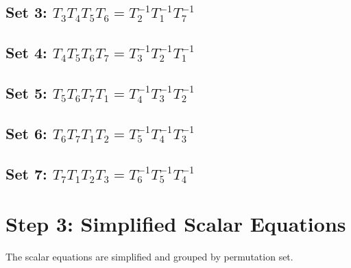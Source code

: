 \documentclass[12pt, a4paper]{article}
\begin{document}
\subsection*{Set 3: $T_{3}T_{4}T_{5}T_{6} = T_{2}^{-1}T_{1}^{-1}T_{7}^{-1}$}
\subsection*{Set 4: $T_{4}T_{5}T_{6}T_{7} = T_{3}^{-1}T_{2}^{-1}T_{1}^{-1}$}
\subsection*{Set 5: $T_{5}T_{6}T_{7}T_{1} = T_{4}^{-1}T_{3}^{-1}T_{2}^{-1}$}
\subsection*{Set 6: $T_{6}T_{7}T_{1}T_{2} = T_{5}^{-1}T_{4}^{-1}T_{3}^{-1}$}
\subsection*{Set 7: $T_{7}T_{1}T_{2}T_{3} = T_{6}^{-1}T_{5}^{-1}T_{4}^{-1}$}
\newpage

\section{Step 3: Simplified Scalar Equations}
The scalar equations are simplified and grouped by permutation set.
\end{document}
